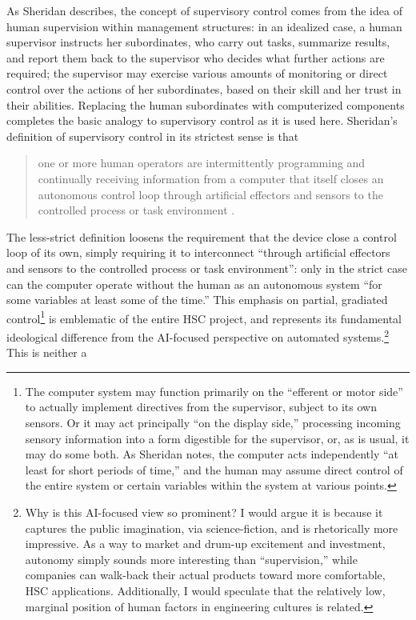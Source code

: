 As Sheridan describes, the concept of
supervisory control comes from
the idea of human supervision within management structures:  in an idealized
case, a human
supervisor instructs her subordinates, who carry out tasks, summarize
results, and report them back to the supervisor who decides what
further actions are required; the supervisor may
exercise various amounts of monitoring or direct control over the
actions of her subordinates, based on their skill and her trust in
their abilities. Replacing the human subordinates with computerized
components completes the basic analogy to supervisory control as it is
used here. Sheridan's definition of supervisory control in its
strictest sense is that
\begin{quote}one or more human operators are intermittently
  programming and continually receiving information from a computer
  that itself closes an autonomous control loop through artificial
  effectors and sensors to the controlled process or task
  environment \cite[p. 1]{sheridan}.\end{quote}
The less-strict definition loosens the requirement that the device
close a control loop of its own, simply requiring it to interconnect
``through artificial effectors and sensors to the controlled process
or task environment'':  only in the strict case can the computer
operate without the human as an autonomous system ``for some
variables at least some of the time.''\cite[p. 1]{sheridan} This
emphasis on partial, gradiated control\footnote{The computer system
  may function primarily on the ``efferent or motor side'' to actually
implement directives from the supervisor, subject to its own
sensors.\cite[p. 3]{sheridan} Or it may act principally ``on the
display side,'' processing incoming sensory information into a form
digestible for the supervisor, or, as is usual, it may do some
both.\cite[p. 3]{sheridan} As Sheridan notes, the computer acts
independently ``at least for short periods of time,'' and the human
may assume direct control of the entire system or certain variables
within the system at various points.\cite[p. 3]{sheridan}} is emblematic of the entire HSC
project, and represents its fundamental ideological difference from
the AI-focused perspective on automated systems.\footnote{Why is this
  AI-focused view so prominent? I would argue it is because it
  captures the public imagination, via science-fiction, and is
  rhetorically more impressive. As a way to market and drum-up
  excitement and investment, autonomy simply sounds more interesting
  than ``supervision,'' while companies can walk-back their actual
  products toward more comfortable, HSC applications. Additionally, I
  would speculate that the relatively low, marginal position of human
  factors in engineering cultures is related.} This is neither a

